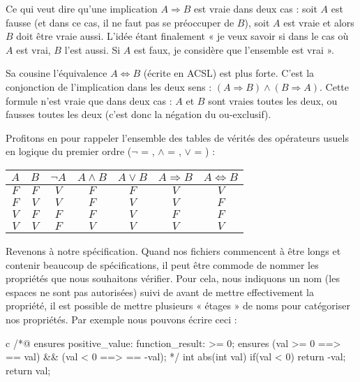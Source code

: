 \documentclass[middle]{zmdocument}
\begin{document}
Ce qui veut dire qu'une implication $A \Rightarrow B$ est vraie dans deux cas : 
soit $A$ est fausse (et dans ce cas, il ne faut pas se préoccuper de $B$), soit 
$A$ est vraie et alors $B$ doit être vraie aussi. L'idée étant finalement « je 
veux savoir si dans le cas où $A$ est vrai, $B$ l'est aussi. Si $A$ est faux, 
je considère que l'ensemble est vrai ».



Sa cousine l'équivalence $A \Leftrightarrow B$ (écrite  en ACSL)
est plus forte. C'est la conjonction de l'implication dans les deux sens :
$(A \Rightarrow B) \wedge (B \Rightarrow A)$. Cette formule n'est vraie que
dans deux cas : $A$ et $B$ sont vraies toutes les deux, ou fausses 
toutes les deux (c'est donc la négation du ou-exclusif).



\begin{Information}
Profitons en pour rappeler l'ensemble des tables de vérités des opérateurs
usuels en logique du premier ordre ($\neg$ = \CodeInline{!}, $\wedge$ = \CodeInline{\&\&},
$\vee$ = \CodeInline{||}) :

\begin{longtabu}{|c|c|c|c|c|c|c|} \hline
$A$ & $B$ & $\neg A$ & $A \wedge B$ & $A \vee B$ & $A \Rightarrow B$ & $A \Leftrightarrow B$ \\ \hline
$F$ & $F$ & $V$ & $F$ & $F$ & $V$ & $V$ \\ \hline
$F$ & $V$ & $V$ & $F$ & $V$ & $V$ & $F$ \\ \hline
$V$ & $F$ & $F$ & $F$ & $V$ & $F$ & $F$ \\ \hline
$V$ & $V$ & $F$ & $V$ & $V$ & $V$ & $V$ \\ \hline
\end{longtabu}
\end{Information}


Revenons à notre spécification. Quand nos fichiers commencent à être longs et 
contenir beaucoup de spécifications, il peut être commode de nommer les 
propriétés que nous souhaitons vérifier. Pour cela, nous indiquons un nom (les 
espaces ne sont pas autorisées) suivi de \CodeInline{:} avant de mettre effectivement
la propriété, il est possible de mettre plusieurs « étages » de noms pour 
catégoriser nos propriétés. Par exemple nous pouvons écrire ceci :



\begin{CodeBlock}{c}
/*@
  ensures positive_value: function_result: \result >= 0;
  ensures (val >= 0 ==> \result == val) && 
          (val < 0 ==> \result == -val);
*/
int abs(int val){
  if(val < 0) return -val;
  return val;
}
\end{CodeBlock}
\end{document}
